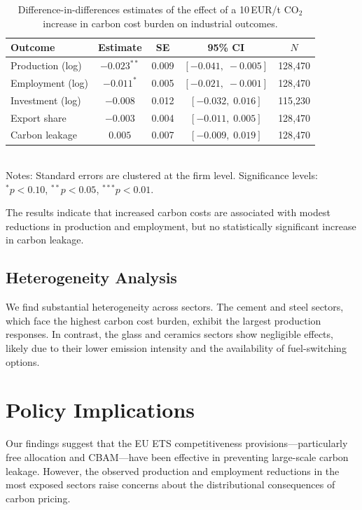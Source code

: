 \documentclass[
    language=english,
    doctype=article,
    institution=none,
    titlestyle=book,
]{../../omnilatex}
\begin{document}
\begin{table}[htbp]
    \centering
    \caption{Difference-in-differences estimates of the effect of a 10\,EUR/t
    CO$_2$ increase in carbon cost burden on industrial outcomes.}
    \label{tab:main-results}
    \begin{tabular}{@{}lcccc@{}}
        \toprule
        \textbf{Outcome} & \textbf{Estimate} & \textbf{SE} &
            \textbf{95\% CI} & \textbf{$N$} \\
        \midrule
        Production (log)  & $-0.023^{**}$ & 0.009 & $[-0.041,\; -0.005]$ &
            128{,}470 \\
        Employment (log)  & $-0.011^{*}$  & 0.005 & $[-0.021,\; -0.001]$ &
            128{,}470 \\
        Investment (log)  & $-0.008$      & 0.012 & $[-0.032,\; 0.016]$ &
            115{,}230 \\
        Export share      & $-0.003$      & 0.004 & $[-0.011,\; 0.005]$ &
            128{,}470 \\
        Carbon leakage    & $0.005$       & 0.007 & $[-0.009,\; 0.019]$ &
            128{,}470 \\
        \bottomrule
    \end{tabular}
    \vspace{1ex}
    \\[0.5ex]
    \footnotesize{Notes: Standard errors are clustered at the firm level.
    Significance levels: $^{*}p < 0.10$, $^{**}p < 0.05$, $^{***}p < 0.01$.}
\end{table}

The results indicate that increased carbon costs are associated with modest
reductions in production and employment, but no statistically significant
increase in carbon leakage.

\subsection{Heterogeneity Analysis}
We find substantial heterogeneity across sectors.  The cement and steel
sectors, which face the highest carbon cost burden, exhibit the largest
production responses.  In contrast, the glass and ceramics sectors show
negligible effects, likely due to their lower emission intensity and the
availability of fuel-switching options.

\section{Policy Implications}
Our findings suggest that the EU ETS competitiveness provisions---particularly
free allocation and CBAM---have been effective in preventing large-scale carbon
leakage.  However, the observed production and employment reductions in the
most exposed sectors raise concerns about the distributional consequences of
carbon pricing.
\end{document}
